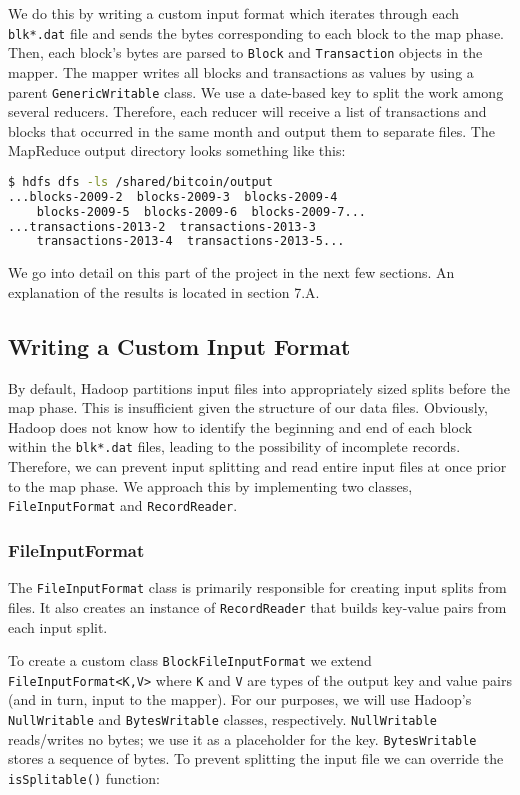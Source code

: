 \documentclass[9pt,twocolumn,twoside]{idsi}
\begin{document}
We do this by writing a custom input format which iterates through each \lstinline{blk*.dat} file and sends the bytes corresponding to each block to the map phase. Then, each block's bytes are parsed to \lstinline{Block} and \lstinline{Transaction} objects in the mapper. The mapper writes all blocks and transactions as values by using a parent \lstinline{GenericWritable} class. We use a date-based key to split the work among several reducers. Therefore, each reducer will receive a list of transactions and blocks that occurred in the same month and output them to separate files. The MapReduce output directory looks something like this:

\begin{lstlisting}[language=bash]
 $ hdfs dfs -ls /shared/bitcoin/output
...blocks-2009-2  blocks-2009-3  blocks-2009-4
    blocks-2009-5  blocks-2009-6  blocks-2009-7...
...transactions-2013-2  transactions-2013-3
    transactions-2013-4  transactions-2013-5...
\end{lstlisting}

We go into detail on this part of the project in the next few sections. An explanation of the results is located in section 7.A.

\subsection{Writing a Custom Input Format}
By default, Hadoop partitions input files into appropriately sized splits before the map phase. This is insufficient given the structure of our data files. Obviously, Hadoop does not know how to identify the beginning and end of each block within the \lstinline{blk*.dat} files, leading to the possibility of incomplete records. Therefore, we can prevent input splitting and read entire input files at once prior to the map phase. We approach this by implementing two classes, \lstinline{FileInputFormat} and \lstinline{RecordReader}.

\subsubsection{FileInputFormat}
The \lstinline{FileInputFormat} class is primarily responsible for creating input splits from files. It also creates an instance of \lstinline{RecordReader} that builds key-value pairs from each input split.

To create a custom class \lstinline{BlockFileInputFormat} we extend \lstinline{FileInputFormat<K,V>} where \lstinline{K} and \lstinline{V} are types of the output key and value pairs (and in turn, input to the mapper). For our purposes, we will use Hadoop's \lstinline{NullWritable} and \lstinline{BytesWritable} classes, respectively. \lstinline{NullWritable} reads/writes no bytes; we use it as a placeholder for the key. \lstinline{BytesWritable} stores a sequence of bytes. To prevent splitting the input file we can override the \lstinline{isSplitable()} function:
\end{document}

